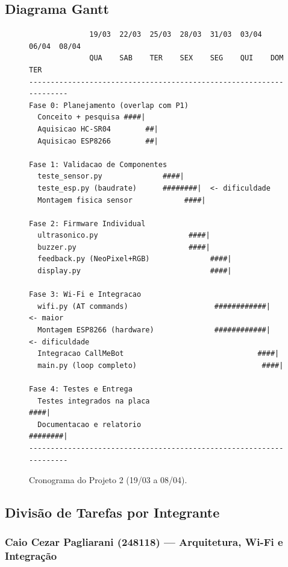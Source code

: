 \documentclass[12pt, a4paper]{article}
\begin{document}
\subsection{Diagrama Gantt}

\begin{figure}[H]
\centering
\begin{verbatim}
              19/03  22/03  25/03  28/03  31/03  03/04  06/04  08/04
              QUA    SAB    TER    SEX    SEG    QUI    DOM    TER
--------------------------------------------------------------------
Fase 0: Planejamento (overlap com P1)
  Conceito + pesquisa ####|
  Aquisicao HC-SR04        ##|
  Aquisicao ESP8266        ##|

Fase 1: Validacao de Componentes
  teste_sensor.py              ####|
  teste_esp.py (baudrate)      ########|  <- dificuldade
  Montagem fisica sensor            ####|

Fase 2: Firmware Individual
  ultrasonico.py                     ####|
  buzzer.py                          ####|
  feedback.py (NeoPixel+RGB)              ####|
  display.py                              ####|

Fase 3: Wi-Fi e Integracao
  wifi.py (AT commands)                    ############|  <- maior
  Montagem ESP8266 (hardware)              ############|  <- dificuldade
  Integracao CallMeBot                               ####|
  main.py (loop completo)                             ####|

Fase 4: Testes e Entrega
  Testes integrados na placa                               ####|
  Documentacao e relatorio                                 ########|
--------------------------------------------------------------------
\end{verbatim}
\caption{Cronograma do Projeto 2 (19/03 a 08/04).}
\end{figure}

\subsection{Divisão de Tarefas por Integrante}

\subsubsection*{Caio Cezar Pagliarani (248118) --- Arquitetura, Wi-Fi e Integração}
\end{document}
